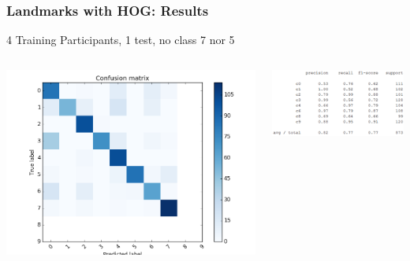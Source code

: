 \documentclass{beamer}
\begin{document}
	
	
	\begin{frame}
		\frametitle{Landmarks with HOG: Results}
		4 Training Participants, 1 test, no class 7 nor 5
		\begin{columns}
			\begin{column}{0.5\textwidth}
				\begin{center}
					\includegraphics[width=\textwidth]{mult_HOG/4c01234689matComparable}\\			
				\end{center}
			\end{column}
			\begin{column}{0.5\textwidth}
				\begin{center}
					\includegraphics[width=\textwidth]{mult_HOG/4c01234689repComparable}
				\end{center}
			\end{column}
		\end{columns}		
	\end{frame}	
	
\end{document}
